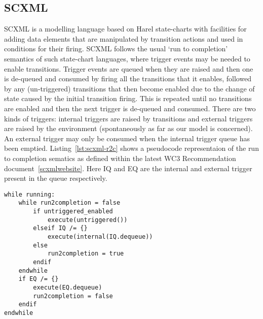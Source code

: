 

\subsection{SCXML}
\label{sec:scxml}

SCXML is a modelling language based on Harel state-charts with facilities for adding data elements that are manipulated by transition actions and used in conditions for their firing. SCXML follows the usual `run to completion' semantics of such state-chart languages, where trigger events may be needed to enable transitions. Trigger events are queued when they are raised and then one is de-queued and consumed by firing all the transitions that it enables, followed by any (un-triggered) transitions that then become enabled due to the change of state caused by the initial transition firing. This is repeated until no transitions are enabled and then the next trigger is de-queued and consumed. There are two kinds of triggers: internal triggers are raised by transitions and external triggers are raised by the environment (spontaneously as far as our model is concerned). An external trigger may only be consumed when the internal trigger queue has been emptied. Listing~\ref{lst:scxml-r2c} shows a pseudocode representaion of the run to completion sematics as defined within the latest WC3 Recommendation document~\ref{scxmlwebsite}. Here IQ and EQ are the internal and external trigger present in the queue respectively. 

\begin{lstlisting}[caption=Pseudocode for 'run to completion',label={lst:scxml-r2c}]
while running:
	while run2completion = false
		if untriggered_enabled
			execute(untriggered())
		elseif IQ /= {}
			execute(internal(IQ.dequeue)) 
		else
			run2completion = true
		endif
	endwhile
	if EQ /= {}
		execute(EQ.dequeue) 
		run2completion = false
	endif
endwhile 
\end{lstlisting}


